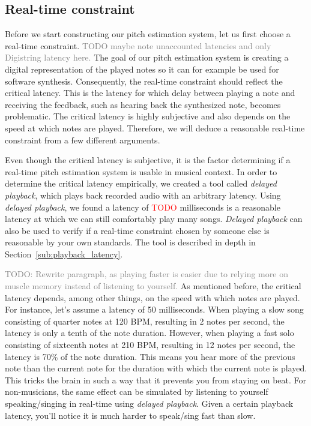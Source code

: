 \documentclass[10pt,twocolumn]{article}
\begin{document}
\subsection{Real-time constraint}  \label{sec:constraint}
Before we start constructing our pitch estimation system, let us first choose a real-time constraint. \textcolor{gray}{TODO maybe note unaccounted latencies and only Digistring latency here.} The goal of our pitch estimation system is creating a digital representation of the played notes so it can for example be used for software synthesis. Consequently, the real-time constraint should reflect the critical latency. This is the latency for which delay between playing a note and receiving the feedback, such as hearing back the synthesized note, becomes problematic. The critical latency is highly subjective and also depends on the speed at which notes are played.
Therefore, we will deduce a reasonable real-time constraint from a few different arguments.

Even though the critical latency is subjective, it is the factor determining if a real-time pitch estimation system is usable in musical context. In order to determine the critical latency empirically, we created a tool called \textit{delayed playback}, which plays back recorded audio with an arbitrary latency. Using \textit{delayed playback}, we found a latency of \textcolor{red}{TODO} milliseconds is a reasonable latency at which we can still comfortably play many songs. \textit{Delayed playback} can also be used to verify if a real-time constraint chosen by someone else is reasonable by your own standards. The tool is described in depth in Section~\ref{sub:playback_latency}.%

\textcolor{gray}{TODO: Rewrite paragraph, as playing faster is easier due to relying more on muscle memory instead of listening to yourself.} As mentioned before, the critical latency depends, among other things, on the speed with which notes are played. For instance, let's assume a latency of 50 milliseconds. When playing a slow song consisting of quarter notes at 120 BPM, resulting in 2 notes per second, the latency is only a tenth of the note duration. However, when playing a fast solo consisting of sixteenth notes at 210 BPM, resulting in 12 notes per second, the latency is 70\% of the note duration. This means you hear more of the previous note than the current note for the duration with which the current note is played. This tricks the brain in such a way that it prevents you from staying on beat. For non-musicians, the same effect can be simulated by listening to yourself speaking/singing in real-time using \textit{delayed playback}. Given a certain playback latency, you'll notice it is much harder to speak/sing fast than slow.
\end{document}
